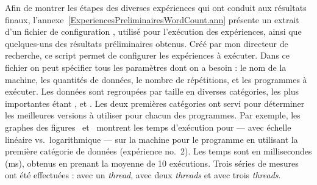 




Afin de montrer les \'etapes des diverses exp\'eriences qui ont conduit aux r\'esultats finaux, l'annexe~\ref{ExperiencesPreliminairesWordCount.ann} pr\'esente un extrait d'un fichier de configuration , utilis\'e pour l'ex\'ecution des expériences, ainsi que quelques-uns des r\'esultats préliminaires obtenus. Cr\'e\'e par mon directeur de recherche, ce script permet de configurer les expériences \`a ex\'ecuter. Dans ce fichier on peut sp\'ecifier tous les param\`etres dont on a besoin : le nom de la machine, les quantités de donn\'ees, le nombre de r\'ep\'etitions, et les programmes \`a ex\'ecuter. Les donn\'ees sont regroup\'ees par taille en diverses cat\'egories, les plus importantes étant ,  et . Les deux premi\`eres cat\'egories ont servi pour d\'eterminer les meilleures versions \`a utiliser pour chacun des programmes. Par exemple, les graphes des figures~ et~ montrent les temps d'ex\'ecution pour  --- avec échelle linéaire vs.\ logarithmique --- sur la machine  pour le programme  en utilisant la premi\`ere cat\'egorie de donn\'ees (expérience no.~2). Les temps sont en millisecondes (ms), obtenus en prenant la moyenne de 10 ex\'ecutions.  Trois  s\'eries de mesures ont \'et\'e effectu\'ees :  avec un \emph{thread},  avec deux \emph{threads} et  avec trois \emph{threads}. 



